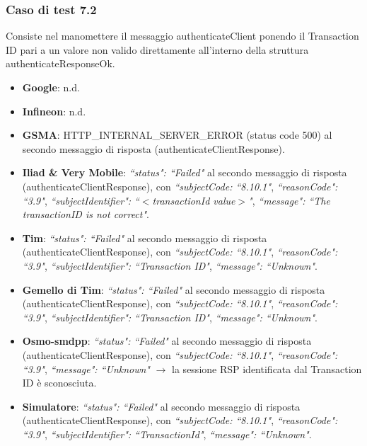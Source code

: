 \documentclass[10pt, oneside]{book}
\begin{document}
\subsubsection{Caso di test 7.2}
Consiste nel manomettere il messaggio authenticateClient ponendo il Transaction ID pari a un valore non valido direttamente all'interno della struttura authenticateResponseOk.
\begin{itemize}
\item \textbf{Google}: n.d.
\item \textbf{Infineon}: n.d.
\item \textbf{GSMA}: HTTP\_INTERNAL\_SERVER\_ERROR (status code 500) al secondo messaggio di risposta (authenticateClientResponse).
\item \textbf{Iliad \& Very Mobile}: \textit{``status": ``Failed"} al secondo messaggio di risposta (authenticateClientResponse), con \textit{``subjectCode: ``8.10.1"}, \textit{``reasonCode": ``3.9"}, \textit{``subjectIdentifier": ``$<$transactionId value$>$"}, \textit{``message": ``The transactionID is not correct"}.
\item \textbf{Tim}: \textit{``status": ``Failed"} al secondo messaggio di risposta (authenticateClientResponse), con \textit{``subjectCode: ``8.10.1"}, \textit{``reasonCode": ``3.9"}, \textit{``subjectIdentifier": ``Transaction ID"}, \textit{``message": ``Unknown"}.
\item \textbf{Gemello di Tim}: \textit{``status": ``Failed"} al secondo messaggio di risposta (authenticateClientResponse), con \textit{``subjectCode: ``8.10.1"}, \textit{``reasonCode": ``3.9"}, \textit{``subjectIdentifier": ``Transaction ID"}, \textit{``message": ``Unknown"}.
\item \textbf{Osmo-smdpp}: \textit{``status": ``Failed"} al secondo messaggio di risposta (authenticateClientResponse), con \textit{``subjectCode: ``8.10.1"}, \textit{``reasonCode": ``3.9"}, \textit{``message": ``Unknown"} $\rightarrow$ la sessione RSP identificata dal Transaction ID è sconosciuta.
\item \textbf{Simulatore}: \textit{``status": ``Failed"} al secondo messaggio di risposta (authenticateClientResponse), con \textit{``subjectCode: ``8.10.1"}, \textit{``reasonCode": ``3.9"}, \textit{``subjectIdentifier": ``TransactionId"}, \textit{``message": ``Unknown"}.
\end{itemize}
\end{document}
